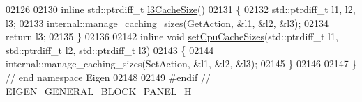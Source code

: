 \begin{DoxyCode}
02126 
02130 \textcolor{keyword}{inline} std::ptrdiff\_t \hyperlink{namespace_eigen_ae2efa4852ea90c2d47b7dcec5b40ba2b}{l3CacheSize}()
02131 \{
02132   std::ptrdiff\_t l1, l2, l3;
02133   internal::manage\_caching\_sizes(GetAction, &l1, &l2, &l3);
02134   \textcolor{keywordflow}{return} l3;
02135 \}
02136 
02142 \textcolor{keyword}{inline} \textcolor{keywordtype}{void} \hyperlink{namespace_eigen_ae64421554aa0a4bf9258bafe3170102b}{setCpuCacheSizes}(std::ptrdiff\_t l1, std::ptrdiff\_t l2, std::ptrdiff\_t l3)
02143 \{
02144   internal::manage\_caching\_sizes(SetAction, &l1, &l2, &l3);
02145 \}
02146 
02147 \} \textcolor{comment}{// end namespace Eigen}
02148 
02149 \textcolor{preprocessor}{#endif // EIGEN\_GENERAL\_BLOCK\_PANEL\_H}
\end{DoxyCode}
